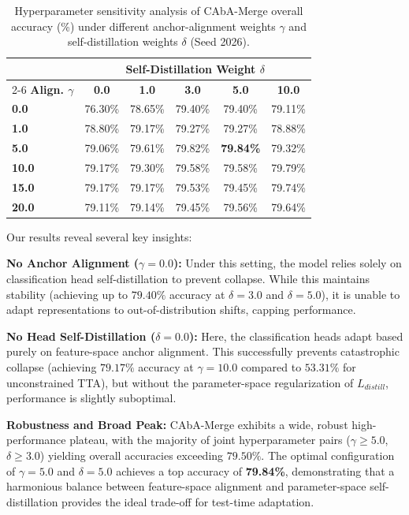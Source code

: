 \documentclass{article}
\theoremstyle{plain}
\theoremstyle{definition}
\theoremstyle{remark}
\begin{document}
\begin{table}[h]
\caption{Hyperparameter sensitivity analysis of CAbA-Merge overall accuracy (\%) under different anchor-alignment weights $\gamma$ and self-distillation weights $\delta$ (Seed 2026).}
\label{tab:sensitivity}
\begin{center}
\setlength{\tabcolsep}{3.2pt}
\begin{tabular}{lccccc}
\toprule
 & \multicolumn{5}{c}{\textbf{Self-Distillation Weight $\delta$}} \\
\cmidrule{2-6}
\textbf{Align. $\gamma$} & \textbf{0.0} & \textbf{1.0} & \textbf{3.0} & \textbf{5.0} & \textbf{10.0} \\
\midrule
\textbf{0.0} & 76.30\% & 78.65\% & 79.40\% & 79.40\% & 79.11\% \\
\textbf{1.0} & 78.80\% & 79.17\% & 79.27\% & 79.27\% & 78.88\% \\
\textbf{5.0} & 79.06\% & 79.61\% & 79.82\% & \textbf{79.84\%} & 79.32\% \\
\textbf{10.0} & 79.17\% & 79.30\% & 79.58\% & 79.58\% & 79.79\% \\
\textbf{15.0} & 79.17\% & 79.17\% & 79.53\% & 79.45\% & 79.74\% \\
\textbf{20.0} & 79.11\% & 79.14\% & 79.45\% & 79.56\% & 79.64\% \\
\bottomrule
\end{tabular}
\end{center}
\end{table}

Our results reveal several key insights:

\textbf{No Anchor Alignment ($\gamma = 0.0$):} Under this setting, the model relies solely on classification head self-distillation to prevent collapse. While this maintains stability (achieving up to $79.40\%$ accuracy at $\delta=3.0$ and $\delta=5.0$), it is unable to adapt representations to out-of-distribution shifts, capping performance.

\textbf{No Head Self-Distillation ($\delta = 0.0$):} Here, the classification heads adapt based purely on feature-space anchor alignment. This successfully prevents catastrophic collapse (achieving $79.17\%$ accuracy at $\gamma=10.0$ compared to $53.31\%$ for unconstrained TTA), but without the parameter-space regularization of $L_{distill}$, performance is slightly suboptimal.

\textbf{Robustness and Broad Peak:} CAbA-Merge exhibits a wide, robust high-performance plateau, with the majority of joint hyperparameter pairs ($\gamma \ge 5.0$, $\delta \ge 3.0$) yielding overall accuracies exceeding $79.50\%$. The optimal configuration of $\gamma = 5.0$ and $\delta = 5.0$ achieves a top accuracy of \textbf{79.84\%}, demonstrating that a harmonious balance between feature-space alignment and parameter-space self-distillation provides the ideal trade-off for test-time adaptation.
\end{document}
